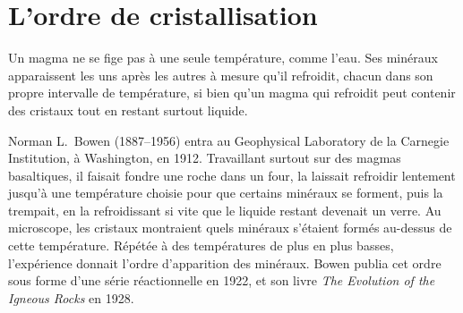 \section{L'ordre de cristallisation}

Un magma ne se fige pas à une seule température, comme l'eau. Ses minéraux
apparaissent les uns après les autres à mesure qu'il refroidit, chacun dans
son propre intervalle de température, si bien qu'un magma qui refroidit
peut contenir des cristaux tout en restant surtout liquide.

\begin{history}
Norman L.~Bowen (1887--1956) entra au Geophysical Laboratory de la Carnegie
Institution, à Washington, en 1912. Travaillant surtout sur des magmas
basaltiques, il faisait fondre une roche dans un four, la laissait
refroidir lentement jusqu'à une température choisie pour que certains
minéraux se forment, puis la trempait, en la refroidissant si vite que le
liquide restant devenait un verre. Au microscope, les cristaux montraient
quels minéraux s'étaient formés au-dessus de cette température. Répétée à
des températures de plus en plus basses, l'expérience donnait l'ordre
d'apparition des minéraux. Bowen publia cet ordre sous forme d'une série
réactionnelle en 1922, et son livre \emph{The Evolution of the Igneous
Rocks} en 1928.
\end{history}

